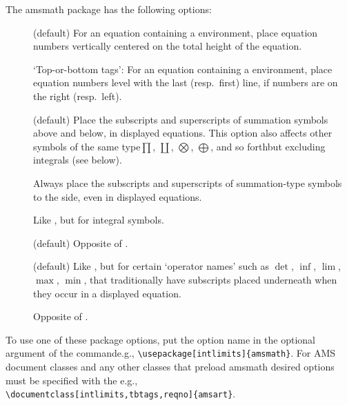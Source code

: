 \documentclass[leqno,titlepage,openany]{amsldoc}[1999/12/13]
\makeatletter
\newcommand{\nipkg}{\textsf}
\let\oldcs\cs
\def\cs#1{\texorpdfstring{\oldcs{#1}}{\@backslashchar\@backslashchar#1}}
\let\cn\cs
\makeatother
\begin{document}
The \nipkg{amsmath} package has the following options:
\begin{description}

\item[] (default) For an equation containing a
 environment, place equation
numbers
vertically centered on the total height of the equation.

\item[] `Top-or-bottom tags': For an equation containing
a  environment, place equation
numbers level with the last
(resp.\ first) line, if numbers are on the right (resp.\ left).

\item[] (default) Place the subscripts and
superscripts\relax
{} of summation symbols
above and below, in displayed equations. This option also affects other
symbols of the same type\mdash $\prod$, $\coprod$, $\bigotimes$,
$\bigoplus$, and so forth\mdash but excluding integrals (see below).

\item[] Always place the subscripts and superscripts of
summation-type symbols to the side, even in displayed equations.

\item[] Like , but for
integral symbols.

\item[] (default) Opposite of .

\item[] (default) Like , but for certain
`operator names' such as $\det$, $\inf$, $\lim$, $\max$, $\min$, that
traditionally have subscripts%
 placed underneath when
they occur in a displayed equation.

\item[] Opposite of .

\end{description}

\goodbreak

To use one of these package options, put the option name in the optional
argument of the \cn{usepackage} command\mdash e.g.,
\verb"\usepackage[intlimits]{amsmath}".
For AMS document classes and any other classes that preload \nipkg{amsmath}
desired options must be specified with the \cn{documentclass}\mdash
e.g.,\\
\verb+\documentclass[intlimits,tbtags,reqno]{amsart}+.
\end{document}
